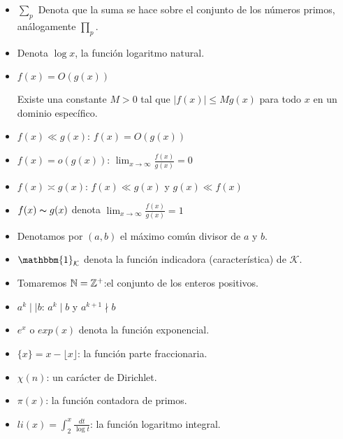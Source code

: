 \begin{itemize}[label=$\bullet$]

\item $\displaystyle\sum_p$ Denota que la suma se hace sobre el conjunto de los números primos, análogamente $\displaystyle\prod_p$.

\item Denota $\log x$, la función logaritmo natural.

\item $f(x)=O\left(g(x)\right)$

Existe una constante $M>0$ tal que $|f(x)|\leq Mg(x)$ para todo $x$ en un dominio específico.

\item $f(x)\ll g(x)$: \quad $f(x)=O(g(x))$

\item $f(x)=o(g(x))$: \quad $\displaystyle\lim_{x \to \infty}\frac{f(x)}{g(x)}=0$

\item $f(x)\asymp g(x)$: \quad $f(x)\ll g(x)$ y $g(x)\ll f(x)$

\item $f(x)\thicksim g(x)$ denota $\displaystyle \lim_{x \to \infty} \frac{f(x)}{g(x)}=1$

\item Denotamos por $(a,b)$ el máximo común divisor de $a$ y $b$.

\item $\mathbbm{1}_{\mathcal{K}}$ denota la función indicadora (característica) de $\mathcal{K}$.

\item Tomaremos $\mathbb{N}=\mathbb{Z}^{+}$:\quad el conjunto de los enteros positivos.

\item $a^k\mid\mid b$: \quad $a^k\mid b$ y $a^{k+1}\nmid b$

\item $e^{x}$ o $exp(x)$ denota la función exponencial.

\item $\{x\}=x-\lfloor x\rfloor$: la función parte fraccionaria.

\item $\chi(n)$: un carácter de Dirichlet.

\item $\pi(x)$: la función contadora  de primos.

\item $li(x)=\displaystyle\int_2^x\frac{dt}{\log t}$: la función logaritmo integral.
\end{itemize}

